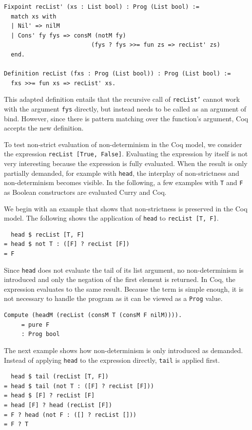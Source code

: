 \documentclass[a4paper, 11pt, fleqn, twoside]{scrreprt}
\newcommand{\hinl}[1]{\texttt{#1}}
\newcommand{\cinl}[1]{\texttt{#1}}
\begin{document}
\begin{verbatim}
Fixpoint recList' (xs : List bool) : Prog (List bool) :=
  match xs with
  | Nil' => nilM
  | Cons' fy fys => consM (notM fy)
                         (fys ? fys >>= fun zs => recList' zs)
  end.

Definition recList (fxs : Prog (List bool)) : Prog (List bool) :=
  fxs >>= fun xs => recList' xs.
\end{verbatim}

This adapted definition entails that the recursive call of \hinl{recList'} cannot work with the argument \cinl{fys} directly, but instead needs to be called as an argument of bind.
However, since there is pattern matching over the function's argument, Coq accepts the new definition.

To test non-strict evaluation of non-determinism in the Coq model, we consider the expression \hinl{recList [True, False]}.
Evaluating the expression by itself is not very interesting because the expression is fully evaluated.
When the result is only partially demanded, for example with \cinl{head}, the interplay of non-strictness and non-determinism becomes visible.
In the following, a few examples with \hinl{T} and \hinl{F} as Boolean constructors are evaluated Curry and Coq.

We begin with an example that shows that non-strictness is preserved in the Coq model.
The following shows the application of \cinl{head} to \cinl{recList [T, F]}.

\begin{verbatim}
  head $ recList [T, F]
= head $ not T : ([F] ? recList [F])
= F
\end{verbatim}

Since \hinl{head} does not evaluate the tail of its list argument, no non-determinism is introduced and only the negation of the first element is returned.
In Coq, the expression evaluates to the same result.
Because the term is simple enough, it is not necessary to handle the program as it can be viewed as a \cinl{Prog} value.

\begin{verbatim}
Compute (headM (recList (consM T (consM F nilM)))).
     = pure F
     : Prog bool
\end{verbatim}

The next example shows how non-determinism is only introduced as demanded.
Instead of applying \hinl{head} to the expression directly, \hinl{tail} is applied first.

\begin{verbatim}
  head $ tail (recList [T, F])
= head $ tail (not T : ([F] ? recList [F]))
= head $ [F] ? recList [F]
= head [F] ? head (recList [F])
= F ? head (not F : ([] ? recList []))
= F ? T
\end{verbatim}
\end{document}
